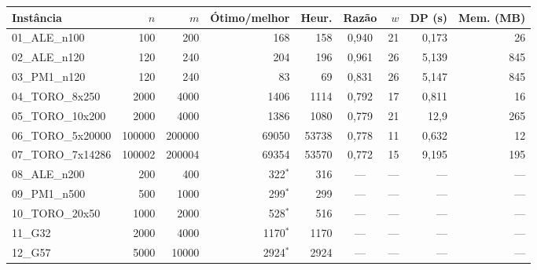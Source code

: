 \begin{tabular}{lrrrrcrrr}\hline
Instância & $n$ & $m$ & Ótimo/melhor & Heur. & Razão & $w$ & DP (s) & Mem. (MB) \\\hline
01\_ALE\_n100 & 100 & 200 & 168 & 158 & 0{,}940 & 21 & 0{,}173 & 26 \\
02\_ALE\_n120 & 120 & 240 & 204 & 196 & 0{,}961 & 26 & 5{,}139 & 845 \\
03\_PM1\_n120 & 120 & 240 & 83 & 69 & 0{,}831 & 26 & 5{,}147 & 845 \\
04\_TORO\_8x250 & 2000 & 4000 & 1406 & 1114 & 0{,}792 & 17 & 0{,}811 & 16 \\
05\_TORO\_10x200 & 2000 & 4000 & 1386 & 1080 & 0{,}779 & 21 & 12{,}9 & 265 \\
06\_TORO\_5x20000 & 100000 & 200000 & 69050 & 53738 & 0{,}778 & 11 & 0{,}632 & 12 \\
07\_TORO\_7x14286 & 100002 & 200004 & 69354 & 53570 & 0{,}772 & 15 & 9{,}195 & 195 \\
08\_ALE\_n200 & 200 & 400 & 322$^*$ & 316 & --- & --- & --- & --- \\
09\_PM1\_n500 & 500 & 1000 & 299$^*$ & 299 & --- & --- & --- & --- \\
10\_TORO\_20x50 & 1000 & 2000 & 528$^*$ & 516 & --- & --- & --- & --- \\
11\_G32 & 2000 & 4000 & 1170$^*$ & 1170 & --- & --- & --- & --- \\
12\_G57 & 5000 & 10000 & 2924$^*$ & 2924 & --- & --- & --- & --- \\
\hline\end{tabular}
